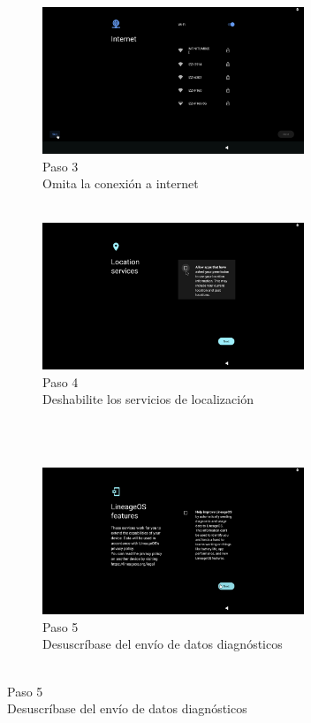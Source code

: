 \documentclass[letterpaper,10.5pt]{article}
\begin{document}
\begin{figure}[H]
	\ContinuedFloat%
	\centering%
	\begin{subfigure}[b]{0.48\linewidth}
		\centering
		\includegraphics[width=0.9\linewidth,height=44mm,keepaspectratio]{img/p02-03-wizard-3.png} %
		\caption{Paso 3\\Omita la conexión a internet\\~}
		\label{fig:setup-wizard-step-3} %
	\end{subfigure}%
	\begin{subfigure}[b]{0.48\linewidth}
		\centering
		\includegraphics[width=0.9\linewidth,height=44mm,keepaspectratio]{img/p02-03-wizard-4.png} %
		\caption{Paso 4\\Deshabilite los servicios de localización\\~}
		\label{fig:setup-wizard-step-4} %
	\end{subfigure}\\
	\begin{subfigure}[b]{0.48\linewidth}
		\centering
		\includegraphics[width=0.9\linewidth,height=44mm,keepaspectratio]{img/p02-03-wizard-5.png} %
		\caption{Paso 5\\Desuscríbase del envío de datos diagnósticos\\~}

\end{subfigure}
\end{figure}
\end{document}
